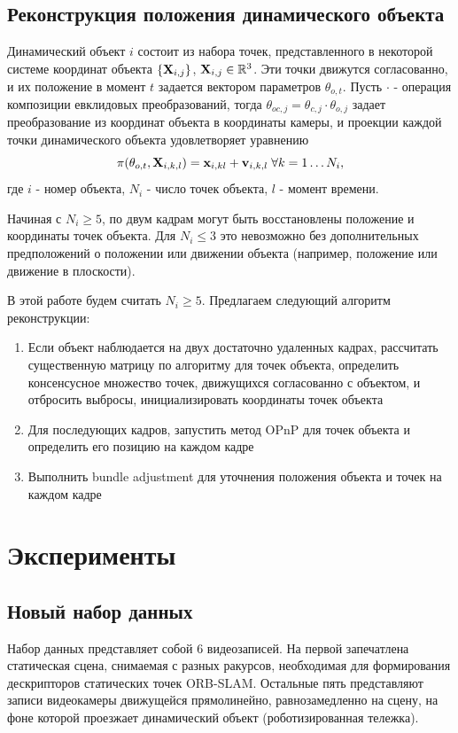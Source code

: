 \documentclass[conference]{IEEEtran}
\begin{document}
\subsection{Реконструкция положения динамического объекта}
Динамический объект $i$ состоит из набора точек, представленного в некоторой системе координат объекта $\{{\bf X}_{i,j} \} $, ${\bf X}_{i,j} \in \mathbb{R}^3$. Эти точки движутся согласованно, и их положение в момент $t$ задается вектором параметров $\theta_{o,t}$. Пусть $\cdot$ - операция композиции евклидовых преобразований, тогда $\theta_{oc, j} = \theta_{c,j} \cdot \theta_{o,j}$ задает преобразование из координат объекта в координаты камеры, и проекции каждой точки динамического объекта удовлетворяет уравнению 
\begin{equation}
\label{eq:dyn}
\pi(\theta_{o,t}, {\bf X}_{i,k,l}) = {\bf x}_{i,kl} + {\bf v}_{i,k,l} \; \forall k = 1 \ldots N_i,
\end{equation}
где $i$ - номер объекта, $N_i$ - число точек объекта, $l$ - момент времени.

Начиная с $N_i \geq 5$, по двум кадрам могут быть восстановлены положение и координаты точек объекта. Для $N_i \leq 3$ это невозможно без дополнительных предположений о положении или движении объекта (например, положение или движение в плоскости).

В этой работе будем считать $N_i \geq 5$. Предлагаем следующий алгоритм реконструкции:
\begin{enumerate}
\item Если объект наблюдается на двух достаточно удаленных кадрах, рассчитать существенную матрицу по алгоритму \cite{nister2004efficient} для точек объекта, определить консенсусное множество точек, движущихся согласованно с объектом, и отбросить выбросы, инициализировать координаты точек объекта
\item Для последующих кадров, запустить метод OPnP \cite{zheng2013} для точек объекта и определить его позицию на каждом кадре
\item Выполнить bundle adjustment для уточнения положения объекта и точек на каждом кадре
\end{enumerate}

\section{Эксперименты}
\subsection{Новый набор данных }
Набор данных представляет собой 6 видеозаписей. На первой запечатлена статическая сцена, снимаемая с разных ракурсов, необходимая для формирования дескрипторов статических точек ORB-SLAM. Остальные пять представляют записи видеокамеры движущейся прямолинейно, равнозамедленно на сцену, на фоне которой проезжает динамический объект (роботизированная тележка).
\end{document}

